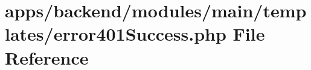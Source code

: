 \hypertarget{backend_2modules_2main_2templates_2error401_success_8php}{\section{apps/backend/modules/main/templates/error401\-Success.php File Reference}
\label{backend_2modules_2main_2templates_2error401_success_8php}
}
